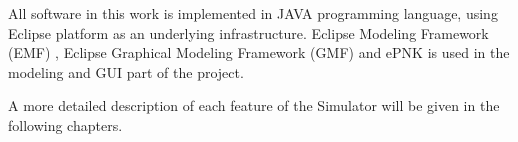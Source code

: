 All software in this work is implemented in JAVA programming language, using Eclipse platform \cite{eclipse} as an underlying infrastructure. Eclipse Modeling Framework (EMF) \cite{emf}, Eclipse Graphical Modeling Framework (GMF) \cite{gmf} and ePNK \cite{epnk} is used in the modeling and GUI part of the project.

A more detailed description of each feature of the Simulator will be given in the following chapters.

